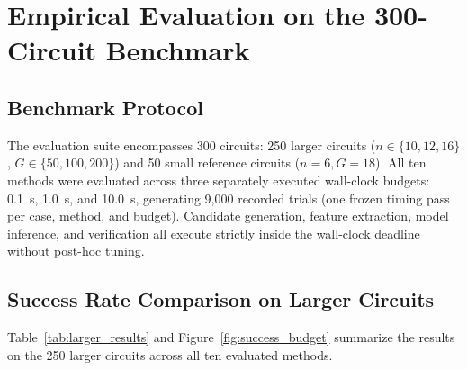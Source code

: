 \documentclass[11pt,a4paper]{article}
\begin{document}
\section{Empirical Evaluation on the 300-Circuit Benchmark}
\label{sec:results}

\subsection{Benchmark Protocol}
The evaluation suite encompasses 300 circuits: 250 larger circuits ($n \in \{10, 12, 16\}$, $G \in \{50, 100, 200\}$) and 50 small reference circuits ($n=6, G=18$). All ten methods were evaluated across three separately executed wall-clock budgets: 0.1~s, 1.0~s, and 10.0~s, generating 9,000 recorded trials (one frozen timing pass per case, method, and budget). Candidate generation, feature extraction, model inference, and verification all execute strictly inside the wall-clock deadline without post-hoc tuning.

\subsection{Success Rate Comparison on Larger Circuits}
Table~\ref{tab:larger_results} and Figure~\ref{fig:success_budget} summarize the results on the 250 larger circuits across all ten evaluated methods.

\begin{table}[t]
\caption{Repair Success Across Execution Budgets on Larger Circuits ($N=250$)}
\label{tab:larger_results}
\centering
{}
\end{table}
\end{document}
